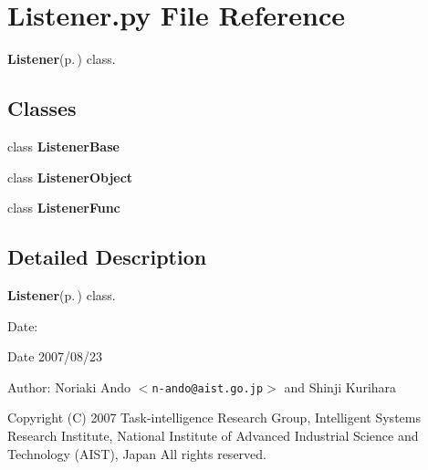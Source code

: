 \section{Listener.py File Reference}
\label{Listener_8py}
{\bf Listener}{\rm (p.\,\pageref{namespaceListener})} class. 

\subsection*{Classes}
\begin{CompactItemize}
\item 
class {\bf Listener\-Base}
\item 
class {\bf Listener\-Object}
\item 
class {\bf Listener\-Func}
\end{CompactItemize}


\subsection{Detailed Description}
{\bf Listener}{\rm (p.\,\pageref{namespaceListener})} class. 

\begin{Desc}
\item[Date:]\begin{Desc}
\item[Date]2007/08/23\end{Desc}
\end{Desc}
\begin{Desc}
\item[Author:]Noriaki Ando $<${\tt n-ando@aist.go.jp}$>$ and Shinji Kurihara\end{Desc}
Copyright (C) 2007 Task-intelligence Research Group, Intelligent Systems Research Institute, National Institute of Advanced Industrial Science and Technology (AIST), Japan All rights reserved.